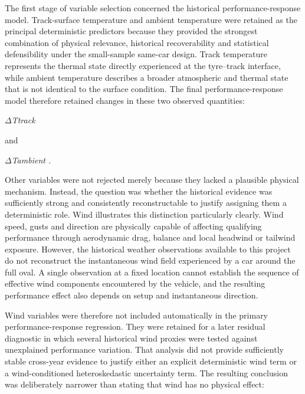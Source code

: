 The first stage of variable selection concerned the historical performance-response model. Track-surface temperature and ambient temperature were retained as the principal deterministic predictors because they provided the strongest combination of physical relevance, historical recoverability and statistical defensibility under the small-sample same-car design. Track temperature represents the thermal state directly experienced at the tyre--track interface, while ambient temperature describes a broader atmospheric and thermal state that is not identical to the surface condition. The final performance-response model therefore retained changes in these two observed quantities:

\begin{center}\textit{\ensuremath{\Delta}Ttrack}\end{center}

and

\begin{center}\textit{\ensuremath{\Delta}Tambient .}\end{center}

Other variables were not rejected merely because they lacked a plausible physical mechanism. Instead, the question was whether the historical evidence was sufficiently strong and consistently reconstructable to justify assigning them a deterministic role. Wind illustrates this distinction particularly clearly. Wind speed, gusts and direction are physically capable of affecting qualifying performance through aerodynamic drag, balance and local headwind or tailwind exposure. However, the historical weather observations available to this project do not reconstruct the instantaneous wind field experienced by a car around the full oval. A single observation at a fixed location cannot establish the sequence of effective wind components encountered by the vehicle, and the resulting performance effect also depends on setup and instantaneous direction.

Wind variables were therefore not included automatically in the primary performance-response regression. They were retained for a later residual diagnostic in which several historical wind proxies were tested against unexplained performance variation. That analysis did not provide sufficiently stable cross-year evidence to justify either an explicit deterministic wind term or a wind-conditioned heteroskedastic uncertainty term. The resulting conclusion was deliberately narrower than stating that wind has no physical effect:

